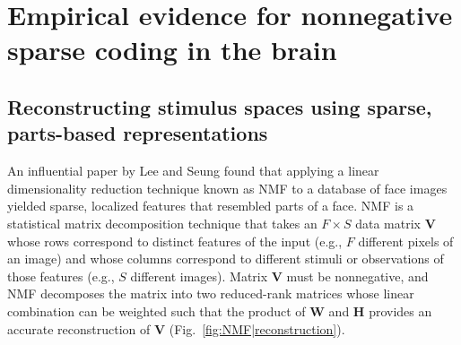 \section{Empirical evidence for nonnegative sparse coding in the brain}

\subsection{Reconstructing stimulus spaces using sparse, parts-based representations}

An influential paper by Lee and Seung \citep{LeeSeung1999}
found that applying a linear dimensionality reduction technique
known as \ac{NMF} to a database of face images
yielded sparse, localized features that resembled parts of a face.
\ac{NMF} is a statistical matrix decomposition technique 
that takes an $F \times S$ data matrix \textbf{V} 
whose rows correspond to distinct features of the input 
(e.g., $F$ different pixels of an image)
and whose columns correspond to different stimuli or 
observations of those features
(e.g., $S$ different images). 
Matrix \textbf{V} must be nonnegative, and \ac{NMF} decomposes the matrix into two reduced-rank matrices whose linear combination can be weighted such that the product of \textbf{W} and \textbf{H} provides an accurate reconstruction of \textbf{V} (Fig.~\ref{fig:NMF|reconstruction}).

